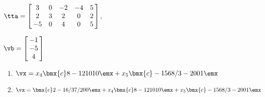 {$\tta = \left[\hskip -3pt \begin{array}{ccccc} 3&0&-2&-4&5\\  2&3&2&0&2
\\  -5&0&4&0&5\end{array}\hskip -3pt \right] $, 

$\vb=\left[\hskip -3pt \begin{array}{c} -1\\  -5\\  
4\end{array}\hskip -3pt \right]$}
{\begin{enumerate}
\item	 $\vx=x_4\bmx{c}8\\-12\\10\\1\\0\emx+x_5\bmx{c} -15\\ 68/3 \\-20\\0\\1 \emx$

\item	$\vx=\bmx{c} 2\\ -16/3\\ 7/2 \\ 0\\ 0  \emx + x_4\bmx{c}8\\-12\\10\\1\\0\emx+x_5\bmx{c} -15\\ 68/3 \\-20\\0\\1 \emx$
\end{enumerate}}


